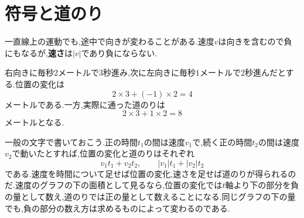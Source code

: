 \section{符号と道のり}\label{節:符号と道のり}
一直線上の運動でも,途中で向きが変わることがある.速度$v$は向きを含むので負にもなるが,\textbf{速さ}は$|v|$であり負にならない.

右向きに毎秒$2$メートルで$3$秒進み,次に左向きに毎秒$1$メートルで$2$秒進んだとする.位置の変化は
\[
 2\times3+(-1)\times2=4
\]
メートルである.一方,実際に通った道のりは
\[
 2\times3+1\times2=8
\]
メートルとなる.

一般の文字で書いておこう.正の時間$t_1$の間は速度$v_1$で,続く正の時間$t_2$の間は速度$v_2$で動いたとすれば,位置の変化と道のりはそれぞれ
\[
 v_1t_1+v_2t_2,\qquad |v_1|t_1+|v_2|t_2
\]
である.速度を時間について足せば位置の変化,速さを足せば道のりが得られるのだ.速度のグラフの下の面積として見るなら,位置の変化では$t$軸より下の部分を負の量として数え,道のりでは正の量として数えることになる.同じグラフの下の量でも,負の部分の数え方は求めるものによって変わるのである.
